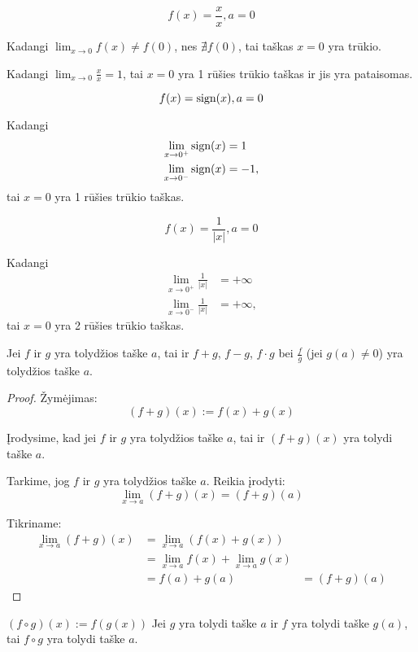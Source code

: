 \begin{exmp}
  \begin{equation*}
    f(x) = \frac{x}{x}, a = 0
  \end{equation*}

  Kadangi $\lim _{x \to 0} f(x) \neq f(0)$, nes $\nexists f(0)$, tai
  taškas $x = 0$ yra trūkio.

  Kadangi $\lim _{x \to 0} \frac{x}{x} = 1$, tai $x = 0$ yra 1 rūšies
  trūkio taškas ir jis yra pataisomas.
\end{exmp}

\begin{exmp}
  \begin{equation*}
    f(x) = \mathop{\text{sign}}(x), a = 0
  \end{equation*}

  Kadangi
  \begin{align*}
    \lim _{x \to 0^{+}} \mathop{\text{sign}}(x) &= 1 \\
    \lim _{x \to 0^{-}} \mathop{\text{sign}}(x) &= -1,
  \end{align*}
  tai $x = 0$ yra 1 rūšies trūkio taškas.
\end{exmp}

\begin{exmp}
  \begin{equation*}
    f(x) = \frac{1}{|x|}, a = 0
  \end{equation*}

  Kadangi
  \begin{align*}
    \lim _{x \to 0^{+}} \frac{1}{|x|} &= +\infty \\
    \lim _{x \to 0^{-}} \frac{1}{|x|} &= +\infty,
  \end{align*}
  tai $x = 0$ yra 2 rūšies trūkio taškas.
\end{exmp}

\begin{prop}
  Jei $f$ ir $g$ yra tolydžios taške $a$, tai ir 
  $f + g$, $f - g$, $f \cdot g$ bei $\frac{f}{g}$ (jei $g(a) \neq 0$) 
  yra tolydžios taške $a$.

  \begin{proof}
    Žymėjimas:
    \begin{equation*}
      (f + g)(x) := f(x) + g(x)
    \end{equation*}

    Įrodysime, kad jei $f$ ir $g$ yra tolydžios taške $a$, tai ir 
    $(f + g)(x)$ yra tolydi taške $a$.

    Tarkime, jog $f$ ir $g$ yra tolydžios taške $a$. Reikia įrodyti:
    \begin{equation*}
      \lim _{x \to a} (f + g)(x) = (f + g)(a)
    \end{equation*}

    Tikriname:
    \begin{align*}
      \lim _{x \to a} (f + g)(x)
      &= \lim _{x \to a} (f(x) + g(x)) \\
      &= \lim _{x \to a} f(x) + \lim _{x \to a} g(x) \\
      &= f(a) + g(a)
      &= (f + g)(a)
    \end{align*}
  \end{proof}
\end{prop}

\begin{prop}
  $ (f \circ g)(x) := f(g(x))$ Jei $g$ yra tolydi taške $a$ ir 
  $f$ yra tolydi taške $g(a)$, tai $f \circ g$ yra tolydi taške $a$.
\end{prop}
